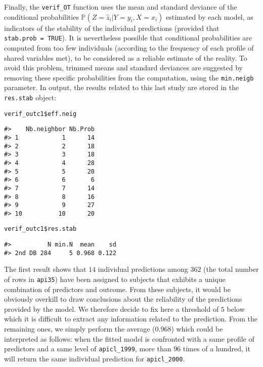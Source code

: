 Finally, the \texttt{verif\_OT} function uses the mean and standard deviance of the conditional probabilities \(\mathbb{P}(Z=\hat{z}_i|Y=y_i,X=x_i)\) estimated by each model, as indicators of the stability of the individual predictions (provided that \texttt{stab.prob\ =\ TRUE}). It is nevertheless possible that conditional probabilities are computed from too few individuals (according to the frequency of each profile of shared variables met), to be considered as a reliable estimate of the reality. To avoid this problem, trimmed means and standard deviances are suggested by removing these specific probabilities from the computation, using the \texttt{min.neigb} parameter. In output, the results related to this last study are stored in the \texttt{res.stab} object:

\begin{verbatim}
verif_outc1$eff.neig
\end{verbatim}

\begin{verbatim}
#>    Nb.neighbor Nb.Prob
#> 1            1      14
#> 2            2      18
#> 3            3      18
#> 4            4      28
#> 5            5      20
#> 6            6       6
#> 7            7      14
#> 8            8      16
#> 9            9      27
#> 10          10      20
\end{verbatim}

\begin{verbatim}
verif_outc1$res.stab
\end{verbatim}

\begin{verbatim}
#>          N min.N  mean    sd
#> 2nd DB 284     5 0.968 0.122
\end{verbatim}

The first result shows that \(14\) individual predictions among \(362\) (the total number of rows in \texttt{api35}) have been assigned to subjects that exhibits a unique combination of predictors and outcome. From these subjects, it would be obviously overkill to draw conclusions about the reliability of the predictions provided by the model. We therefore decide to fix here a threshold of \(5\) below which it is difficult to extract any information related to the prediction. From the remaining ones, we simply perform the average (\(0.968\)) which could be interpreted as follows: when the fitted model is confronted with a same profile of predictors and a same level of \texttt{apicl\_1999}, more than \(96\) times of a hundred, it will return the same individual prediction for \texttt{apicl\_2000}.

